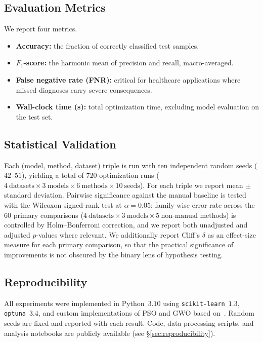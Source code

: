 \documentclass[letterpaper, 10 pt, conference]{ieeeconf}
\begin{document}
\subsection{Evaluation Metrics}

We report four metrics.
\begin{itemize}
	\item \textbf{Accuracy:} the fraction of correctly classified test samples.
	\item \textbf{$F_1$-score:} the harmonic mean of precision and recall, macro-averaged.
	\item \textbf{False negative rate (FNR):} critical for healthcare applications where missed diagnoses carry severe consequences.
	\item \textbf{Wall-clock time (s):} total optimization time, excluding model evaluation on the test set.
\end{itemize}

\subsection{Statistical Validation}

Each (model, method, dataset) triple is run with ten independent random seeds ($42$--$51$), yielding a total of $720$ optimization runs ($4~\text{datasets} \times 3~\text{models} \times 6~\text{methods} \times 10~\text{seeds}$). For each triple we report mean $\pm$ standard deviation. Pairwise significance against the manual baseline is tested with the Wilcoxon signed-rank test at $\alpha = 0.05$; family-wise error rate across the $60$ primary comparisons ($4~\text{datasets} \times 3~\text{models} \times 5~\text{non-manual methods}$) is controlled by Holm--Bonferroni correction, and we report both unadjusted and adjusted $p$-values where relevant. We additionally report Cliff's $\delta$ as an effect-size measure for each primary comparison, so that the practical significance of improvements is not obscured by the binary lens of hypothesis testing.

\subsection{Reproducibility}

All experiments were implemented in Python~$3.10$ using \texttt{scikit-learn}~$1.3$, \texttt{optuna}~$3.4$, and custom implementations of PSO and GWO based on~\cite{kennedy1995, mirjalili2014}. Random seeds are fixed and reported with each result. Code, data-processing scripts, and analysis notebooks are publicly available (see \S\ref{sec:reproducibility}).
\end{document}
